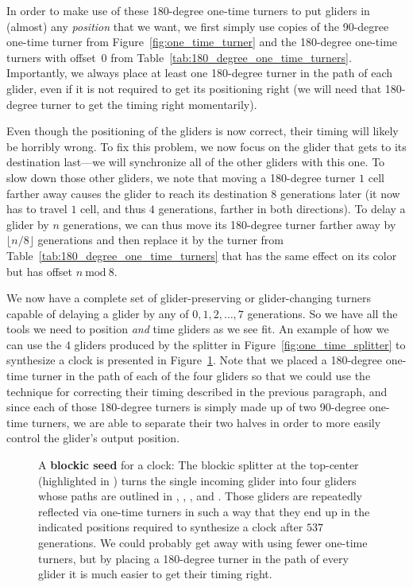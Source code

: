 In order to make use of these 180-degree one-time turners to put gliders in (almost) any \emph{position} that we want, we first simply use copies of the 90-degree one-time turner from Figure~\ref{fig:one_time_turner} and the 180-degree one-time turners with offset~0 from Table~\ref{tab:180_degree_one_time_turners}. Importantly, we always place at least one 180-degree turner in the path of each glider, even if it is not required to get its positioning right (we will need that 180-degree turner to get the timing right momentarily).

Even though the positioning of the gliders is now correct, their timing will likely be horribly wrong. To fix this problem, we now focus on the glider that gets to its destination last---we will synchronize all of the other gliders with this one. To slow down those other gliders, we note that moving a 180-degree turner $1$ cell farther away causes the glider to reach its destination $8$ generations later (it now has to travel $1$ cell, and thus $4$ generations, farther in both directions). To delay a glider by $n$ generations, we can thus move its 180-degree turner farther away by $\lfloor n/8 \rfloor$ generations and then replace it by the turner from Table~\ref{tab:180_degree_one_time_turners} that has the same effect on its color but has offset $n \ \text{mod} \ 8$.

We now have a complete set of glider-preserving or glider-changing turners capable of delaying a glider by any of $0,1,2,\ldots,7$ generations.  So we have all the tools we need to position \emph{and} time gliders as we see fit. An example of how we can use the $4$ gliders produced by the splitter in Figure~\ref{fig:one_time_splitter} to synthesize a clock is presented in Figure~\ref{fig:clock_slow_salvo}. Note that we placed a 180-degree one-time turner in the path of each of the four gliders so that we could use the technique for correcting their timing described in the previous paragraph, and since each of those 180-degree turners is simply made up of two 90-degree one-time turners, we are able to separate their two halves in order to more easily control the glider's output position.

\begin{figure}[!htb]
	\centering
	\caption{A \textbf{blockic seed} for a clock: The blockic splitter at the top-center (highlighted in ) turns the single incoming glider into four gliders whose paths are outlined in , , , and . Those gliders are repeatedly reflected via one-time turners in such a way that they end up in the indicated positions required to synthesize a clock after $537$ generations. We could probably get away with using fewer one-time turners, but by placing a 180-degree turner in the path of every glider it is much easier to get their timing right.}
	\label{fig:clock_slow_salvo}
\end{figure}

